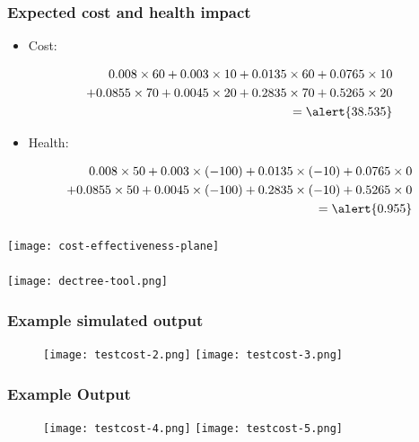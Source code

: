 \documentclass[t]{beamer}
\begin{document}
\begin{frame}
\frametitle{Expected cost and health impact}
	\begin{itemize}
		\item Cost:
		\end{itemize}
\begin{eqnarray*}
&& 0.008 \times 60 + 0.003 \times 10 + 0.0135 \times 60 + 0.0765 \times 10\\
&& + 0.0855 \times 70 + 0.0045 \times 20 + 0.2835 \times 70 + 0.5265 \times 20\\
&& = \alert{38.535}
\end{eqnarray*}
	\begin{itemize}
		\item Health:
		\end{itemize}
\begin{eqnarray*}
&& 0.008 \times 50 + 0.003 \times (-100) + 0.0135 \times (-10) + 0.0765 \times 0\\
&&  + 0.0855 \times 50 + 0.0045 \times (-100) + 0.2835 \times (-10) + 0.5265 \times 0\\
&& = \alert{0.955}
\end{eqnarray*}
\end{frame}


\begin{frame}
\frametitle{}
 \texttt{[image: cost-effectiveness-plane]}
\end{frame}


\begin{frame}
\frametitle{}
 \texttt{[image: dectree-tool.png]}
\end{frame}


\begin{frame}
\frametitle{Example simulated output}
\begin{figure}
\vspace*{-1cm}
	\centering
			\texttt{[image: testcost-2.png]}
		\texttt{[image: testcost-3.png]}
\end{figure}
\end{frame}

\begin{frame}
\frametitle{Example Output}
\begin{figure}
\vspace*{-1cm}
	\centering
			\texttt{[image: testcost-4.png]}
		\texttt{[image: testcost-5.png]}
\end{figure}
\end{frame}
\end{document}
